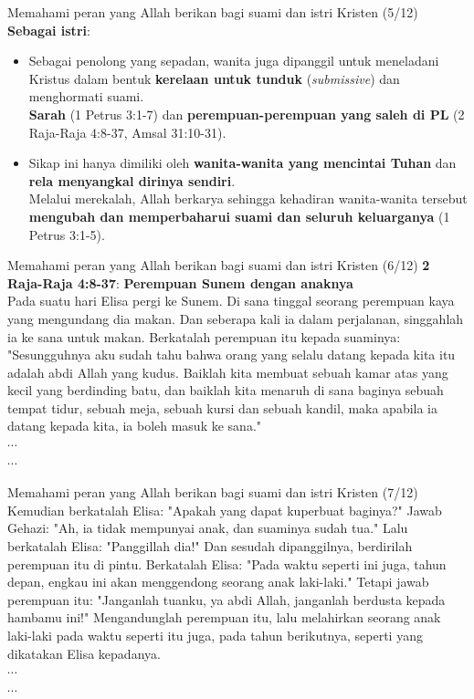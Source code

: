 \documentclass{beamer}
\theoremstyle{mystyle}
\begin{document}
\begin{frame}{Memahami peran yang Allah berikan bagi suami dan istri Kristen (5/12)}
	\textbf{Sebagai istri}:
	\begin{itemize}
		\item Sebagai penolong yang sepadan, wanita juga dipanggil untuk meneladani Kristus dalam bentuk \textbf{kerelaan untuk tunduk} (\textit{submissive}) dan menghormati suami. \\
		\textbf{Sarah} (1 Petrus 3:1-7) dan \textbf{perempuan-perempuan yang saleh di PL} (2 Raja-Raja 4:8-37, Amsal 31:10-31).
		\item Sikap ini hanya dimiliki oleh \textbf{wanita-wanita yang mencintai Tuhan} dan \textbf{rela menyangkal dirinya sendiri}. \\
		Melalui merekalah, Allah berkarya sehingga kehadiran wanita-wanita tersebut \textbf{mengubah dan memperbaharui suami dan seluruh keluarganya} (1 Petrus 3:1-5).		
	\end{itemize}
\end{frame}

\begin{frame}{Memahami peran yang Allah berikan bagi suami dan istri Kristen (6/12)}
	\textbf{2 Raja-Raja 4:8-37}: \textbf{Perempuan Sunem dengan anaknya} \\
	Pada suatu hari Elisa pergi ke Sunem. Di sana tinggal seorang perempuan kaya yang mengundang dia makan. Dan seberapa kali ia dalam perjalanan, singgahlah ia ke sana untuk makan. Berkatalah perempuan itu kepada suaminya: "Sesungguhnya aku sudah tahu bahwa orang yang selalu datang kepada kita itu adalah abdi Allah yang kudus. Baiklah kita membuat sebuah kamar atas yang kecil yang berdinding batu, dan baiklah kita menaruh di sana baginya sebuah tempat tidur, sebuah meja, sebuah kursi dan sebuah kandil, maka apabila ia datang kepada kita, ia boleh masuk ke sana."  \\
	$\cdots$ \\
	$\cdots$
\end{frame}

\begin{frame}{Memahami peran yang Allah berikan bagi suami dan istri Kristen (7/12)}
	Kemudian berkatalah Elisa: "Apakah yang dapat kuperbuat baginya?" Jawab Gehazi: "Ah, ia tidak mempunyai anak, dan suaminya sudah tua." Lalu berkatalah Elisa: "Panggillah dia!" Dan sesudah dipanggilnya, berdirilah perempuan itu di pintu. Berkatalah Elisa: "Pada waktu seperti ini juga, tahun depan, engkau ini akan menggendong seorang anak laki-laki." Tetapi jawab perempuan itu: "Janganlah tuanku, ya abdi Allah, janganlah berdusta kepada hambamu ini!" Mengandunglah perempuan itu, lalu melahirkan seorang anak laki-laki pada waktu seperti itu juga, pada tahun berikutnya, seperti yang dikatakan Elisa kepadanya. \\
	$\cdots$ \\
	$\cdots$ 
\end{frame}
\end{document}
